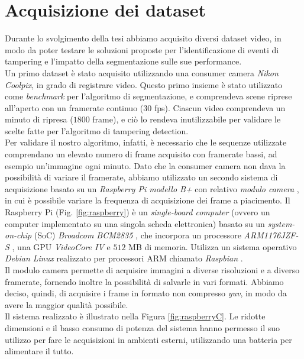 \section{Acquisizione dei dataset}
\label{acquisizione}
Durante lo svolgimento della tesi abbiamo acquisito diversi dataset video, in modo da poter testare le soluzioni proposte per l'identificazione di eventi di tampering e l'impatto della segmentazione sulle sue performance.\\
Un primo dataset \`e stato acquisito utilizzando una consumer camera \textit{Nikon Coolpix}, in grado di registrare video.
Questo primo insieme \`e stato utilizzato come \textit{benchmark} per l'algoritmo di segmentazione, e comprendeva scene riprese all'aperto con un framerate continuo ($30$ fps).
Ciascun video comprendeva un minuto di ripresa ($1800$ frame), e ci\`o lo rendeva inutilizzabile per validare le scelte fatte per l'algoritmo di tampering detection.\\
Per validare il nostro algoritmo, infatti, \`e necessario che le sequenze utilizzate comprendano un elevato numero di frame acquisito con framerate bassi, ad esempio un'immagine ogni minuto. 
Dato che la consumer camera non dava la possibilit\`a di variare il framerate, abbiamo utilizzato un secondo sistema di acquisizione basato su un \textit{Raspberry Pi modello B+} \cite{raspberry} con relativo \textit{modulo camera} \cite{raspberryCamera}, in cui \`e possibile variare la frequenza di acquisizione dei frame a piacimento.
Il Raspberry Pi (Fig. \ref{fig:raspberry}) \`e un \textit{single-board computer} (ovvero un computer implementato su una singola scheda elettronica) basato su un \textit{system-on-chip} (SoC) \textit{Broadcom BCM2835} \cite{broadcom}, che incorpora un processore \textit{ARM1176JZF-S} \cite{arm}, una GPU \textit{VideoCore IV} \cite{gpu} e $512$ MB di memoria.
Utilizza un sistema operativo \textit{Debian Linux} realizzato per processori ARM chiamato \textit{Raspbian} \cite{raspbian}.\\
Il modulo camera permette di acquisire immagini a diverse risoluzioni e a diverso framerate, fornendo inoltre la possibilit\`a di salvarle in vari formati.
Abbiamo deciso, quindi, di acquisire i frame in formato non compresso \textit{yuv}, in modo da avere la maggior qualit\`a possibile.\\
Il sistema realizzato \`e illustrato nella Figura \ref{fig:raspberryC}. Le ridotte dimensioni e il basso consumo di potenza del sistema hanno permesso il suo utilizzo per fare le acquisizioni in ambienti esterni, utilizzando una batteria per alimentare il tutto. 
